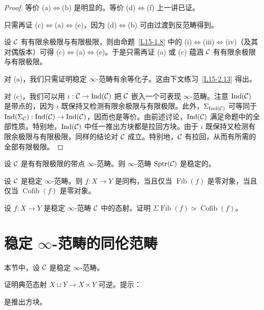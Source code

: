 \begin{proof}
等价 (a)$\Leftrightarrow$(b) 是明显的。等价 (d)$\Leftrightarrow$(f) 上一讲已证。

只需再证 (c)$\Leftrightarrow$(a)$\Leftrightarrow$(e)，因为 (d)$\Leftrightarrow$(b) 可由过渡到反范畴得到。

设 $\mathcal{C}$ 有有限余极限与有限极限，则由命题~\ref{L15-1.8} 中的 (i)$\Leftrightarrow$(iii)$\Leftrightarrow$(iv)（及其对偶版本）可得 (c)$\Leftrightarrow$(a)$\Leftrightarrow$(e)。于是只需再证 (a) 或 (c) 蕴涵 $\mathcal{C}$ 有有限余极限与有限极限。

对 (a)，我们只需证明稳定 $\infty$-范畴有余等化子。这由下文练习~\ref{L15-2.13} 得出。

对 (c)，我们可以用 $\iota:\mathcal{C}\to\operatorname{Ind}(\mathcal{C})$ 把 $\mathcal{C}$ 嵌入一个可表现 $\infty$-范畴。注意 $\operatorname{Ind}(\mathcal{C})$ 是带点的，因为 $\iota$ 既保持又检测有限余极限与有限极限。此外，$\Sigma_{\operatorname{Ind}(\mathcal{C})}$ 可等同于 $\operatorname{Ind}(\Sigma_{\mathcal{C}}):\operatorname{Ind}(\mathcal{C})\to\operatorname{Ind}(\mathcal{C})$，因而也是等价。由前述讨论，$\operatorname{Ind}(\mathcal{C})$ 满足命题中的全部性质。特别地，$\operatorname{Ind}(\mathcal{C})$ 中任一推出方块都是拉回方块。由于 $\iota$ 既保持又检测有限余极限与有限极限，同样的结论对 $\mathcal{C}$ 成立。特别地，$\mathcal{C}$ 有拉回，从而有所需的全部有限极限。
\end{proof}

\begin{corollary}\label{L15-1.11}
设 $\mathcal{C}$ 是有有限极限的带点 $\infty$-范畴。则 $\infty$-范畴 $\mathrm{Sptr}(\mathcal{C})$ 是稳定的。
\end{corollary}

\begin{exercise}\label{L15-1.12}
设 $\mathcal{C}$ 是稳定 $\infty$-范畴。则 $f:X\to Y$ 是同构，当且仅当 $\operatorname{Fib}(f)$ 是零对象，当且仅当 $\operatorname{Cofib}(f)$ 是零对象。
\end{exercise}

\begin{exercise}\label{L15-1.13}
设 $f:X\to Y$ 是稳定 $\infty$-范畴 $\mathcal{C}$ 中的态射。证明 $\Sigma\operatorname{Fib}(f)\simeq\operatorname{Cofib}(f)$。
\end{exercise}

\section{稳定 $\infty$-范畴的同伦范畴}

\nitem\label{L15-2.1} 本节中，设 $\mathcal{C}$ 是稳定 $\infty$-范畴。

\begin{exercise}\label{L15-2.2}
证明典范态射 $X\sqcup Y\to X\times Y$ 可逆。提示：
\begin{center}
\end{center}
是推出方块。
\end{exercise}

